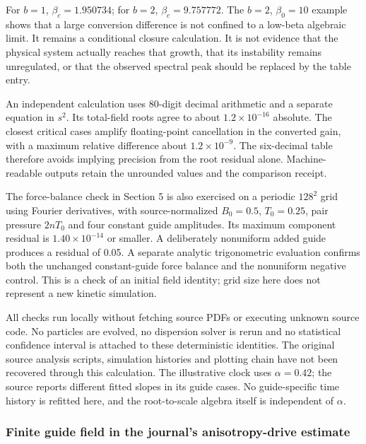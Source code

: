 For \(b=1\), \(\beta_c=1.950734\); for \(b=2\), \(\beta_c=9.757772\).
The \(b=2\), \(\beta_0=10\) example shows that a large conversion
difference is not confined to a low-beta algebraic limit. It remains a
conditional closure calculation. It is not evidence that the physical
system actually reaches that growth, that its instability remains
unregulated, or that the observed spectral peak should be replaced by
the table entry.

An independent calculation uses 80-digit decimal arithmetic and a
separate equation in \(s^2\). Its total-field roots agree to about
\(1.2\times10^{-16}\) absolute. The closest critical cases amplify
floating-point cancellation in the converted gain, with a maximum
relative difference about \(1.2\times10^{-9}\). The six-decimal table
therefore avoids implying precision from the root residual alone.
Machine-readable outputs retain the unrounded values and the comparison
receipt.

The force-balance check in Section 5 is also exercised on a periodic
\(128^2\) grid using Fourier derivatives, with source-normalized
\(B_0=0.5\), \(T_0=0.25\), pair pressure \(2nT_0\) and four constant
guide amplitudes. Its maximum component residual is
\(1.40\times10^{-14}\) or smaller. A deliberately nonuniform added guide
produces a residual of 0.05. A separate analytic trigonometric
evaluation confirms both the unchanged constant-guide force balance and
the nonuniform negative control. This is a check of an initial field
identity; grid size here does not represent a new kinetic simulation.

All checks run locally without fetching source PDFs or executing unknown
source code. No particles are evolved, no dispersion solver is rerun and
no statistical confidence interval is attached to these deterministic
identities. The original source analysis scripts, simulation histories
and plotting chain have not been recovered through this calculation. The
illustrative clock uses \(\alpha=0.42\); the source reports different
fitted slopes in its guide cases. No guide-specific time history is
refitted here, and the root-to-scale algebra itself is independent of
\(\alpha\).

\subsubsection{Finite guide field in the journal's anisotropy-drive
estimate}\label{finite-guide-field-in-the-journals-anisotropy-drive-estimate}

